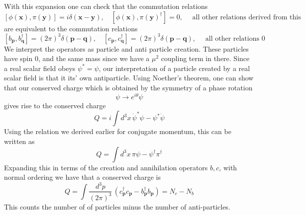 \documentclass[11pt, oneside]{article}   	%
\theoremstyle{newline}
\theoremstyle{newline}
\theoremstyle{newline}
\theoremstyle{newline}
\theoremstyle{newline}
\newcommand{\intp}{ \int \frac{ d^3 p }{ (2 \pi)^3 } \, }
\newcommand{\ve}[1]{ \mathbf{ #1 } }
\newcommand{\scal}[1]{\phi ( \mathbf{ #1 })}
\newcommand{\mom}[1]{ \pi (\mathbf{ #1 })}
\newcommand{\arr}{\rightarrow}
\newcommand{\anop}[2]{ #1_\mathbf{#2}}
\newcommand{\crop}[2]{#1_\mathbf{#2}^\dagger}
\begin{document}
With this expansion one can check that the commutation relations 
\[ 
[ \scal{ x}, \mom{ y } ] = i \delta( \ve{ x - y } ), \quad [ \scal{x}, \mom{ y }^\dagger ]  = 0, \quad \text{ all other relations derived from this } 
\] are equivalent to the commutation relations 
\[ 	
[ \anop{ b }{ p}, \crop{ b }{ q}]  = ( 2\pi) ^3 \delta ( \ve{ p -q } ), \quad [ \anop{ c }{ p}, \crop{ c }{ q}]  = ( 2\pi) ^3 \delta ( \ve{ p -q } ), \quad \text{ all other relations 0 } 
\] We interpret the operators as particle and anti particle creation. These particles have spin 0, and the same mass since we have a $\mu^2 $ coupling term in there. Since a real scalar field obeys $\psi^* = \psi $, our interpretation of a particle created by a real scalar field is that it its' own antiparticle. Using Noether's theorem, one can show that our conserved charge which is obtained by the symmetry of a phase rotation 
\[	
\psi \arr e^{ i \theta} \psi 
\] gives rise to the conserved charge 
\[
Q  = i \int d^3 x \,  \dot{ \psi}^* \psi - \psi^* \dot{ \psi }  
\] Using the relation we derived earlier for conjugate momentum, this can be written as 
\[ 
Q = \int d^3 x\, \pi \psi - \psi^\dagger \pi^\dagger 
\] Expanding this in terms of the creation and annihilation operators $b,c$, with normal ordering we have that a conserved charge is 
\[ 	 
Q  = \intp ( \crop{ c}{ p} \anop{c}{ p } - \crop{ b }{ p } \anop{ b }{ p } ) = N_c - N_b 
\] This counts the number of of particles minus the number of anti-particles. 

\pagebreak
\end{document}
